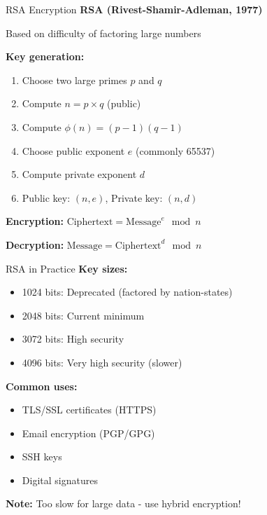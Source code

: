 \documentclass{beamer}
\begin{document}
\begin{frame}{RSA Encryption}
\textbf{RSA (Rivest-Shamir-Adleman, 1977)}

Based on difficulty of factoring large numbers

\vspace{0.3cm}
\textbf{Key generation:}
\begin{enumerate}
    \item Choose two large primes $p$ and $q$
    \item Compute $n = p \times q$ (public)
    \item Compute $\phi(n) = (p-1)(q-1)$
    \item Choose public exponent $e$ (commonly 65537)
    \item Compute private exponent $d$
    \item Public key: $(n, e)$, Private key: $(n, d)$
\end{enumerate}

\vspace{0.3cm}
\textbf{Encryption:} $\text{Ciphertext} = \text{Message}^e \mod n$

\textbf{Decryption:} $\text{Message} = \text{Ciphertext}^d \mod n$

\end{frame}

\begin{frame}{RSA in Practice}
\textbf{Key sizes:}
\begin{itemize}
    \item 1024 bits: \alert{Deprecated} (factored by nation-states)
    \item 2048 bits: Current minimum
    \item 3072 bits: High security
    \item 4096 bits: Very high security (slower)
\end{itemize}

\vspace{0.3cm}
\textbf{Common uses:}
\begin{itemize}
    \item TLS/SSL certificates (HTTPS)
    \item Email encryption (PGP/GPG)
    \item SSH keys
    \item Digital signatures
\end{itemize}

\vspace{0.3cm}
\textbf{Note:} Too slow for large data - use hybrid encryption!
\end{frame}
\end{document}
